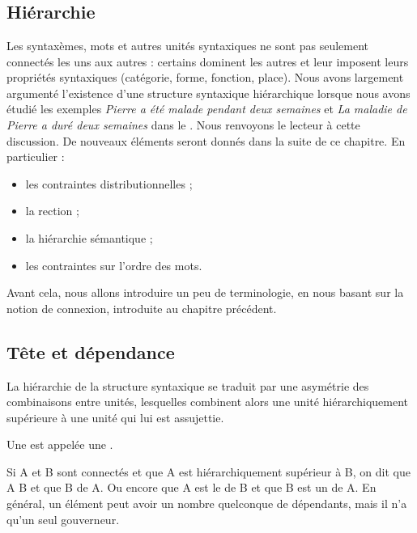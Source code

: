 \chapter{}\label{sec:3.3}

\section{Hiérarchie}\label{sec:3.3.0}

Les syntaxèmes, mots et autres unités syntaxiques ne sont pas seulement connectés les uns aux autres : certains dominent les autres et leur imposent leurs propriétés syntaxiques (catégorie, forme, fonction, place). Nous avons largement argumenté l’existence d’une structure syntaxique hiérarchique lorsque nous avons étudié les exemples \textit{Pierre a été malade pendant deux semaines} et \textit{La maladie de Pierre a duré deux semaines} dans le . Nous renvoyons le lecteur à cette discussion. De nouveaux éléments seront donnés dans la suite de ce chapitre. En particulier :

\begin{itemize}
\item les contraintes distributionnelles ;
\item la rection ;
\item la hiérarchie sémantique ;
\item les contraintes sur l’ordre des mots.
\end{itemize}

Avant cela, nous allons introduire un peu de terminologie, en nous basant sur la notion de connexion, introduite au chapitre précédent.

\section{Tête et dépendance}\label{sec:3.3.1}

La hiérarchie de la structure syntaxique se traduit par une asymétrie des combinaisons entre unités, lesquelles combinent alors une unité hiérarchiquement supérieure à une unité qui lui est assujettie.

{Une  est appelée une .}

{Si A et B sont connectés et que A est hiérarchiquement supérieur à B, on dit que A  B et que B  de A. Ou encore que A est le  de B et que B est un  de A. En général, un élément peut avoir un nombre quelconque de dépendants, mais il n’a qu’un seul gouverneur.}

